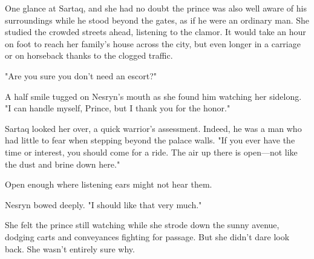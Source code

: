 One glance at Sartaq, and she had no doubt the prince was also well aware of his surroundings while he stood beyond the gates, as if he were an ordinary man.
She studied the crowded streets ahead, listening to the clamor.
It would take an hour on foot to reach her family's house across the city, but even longer in a carriage or on horseback thanks to the clogged traffic.

"Are you sure you don't need an escort?"

A half smile tugged on Nesryn's mouth as she found him watching her sidelong.
"I can handle myself, Prince, but I thank you for the honor."

Sartaq looked her over, a quick warrior's assessment.
Indeed, he was a man who had little to fear when stepping beyond the palace walls.
"If you ever have the time or interest, you should come for a ride.
The air up there is open---not like the dust and brine down here."

Open enough where listening ears might not hear them.

Nesryn bowed deeply.
"I should like that very much."

She felt the prince still watching while she strode down the sunny avenue, dodging carts and conveyances fighting for passage.
But she didn't dare look back.
She wasn't entirely sure why.

